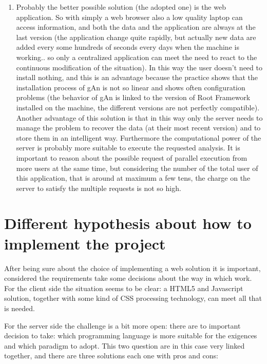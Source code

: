 \begin{enumerate}
\item
Probably the better possible solution (the adopted one) is the web application. So with simply a web browser also a low quality laptop can access information, and both the data and the application are always at the last version (the application change quite rapidly, but actually new data are added every some hundreds of seconds every days when the machine is working.. so only a centralized application can meet the need to react to the continuous modification of the situation).
In this way the user doesn't need to install nothing, and this is an advantage because the practice shows that the installation process of gAn is not so linear and shows often configuration problems (the behavior of gAn is linked to the version of Root Framework installed on the machine, the different versions are not perfectly compatible). Another advantage of this solution is that in this way only the server needs to manage the problem to recover the data (at their most recent version) and to store them in an intelligent way. Furthermore the computational power of the server is probably more suitable to execute the requested analysis. It is important to reason about the possible request of parallel execution from more users at the same time, but considering the number of the total user of this application, that is around at maximum a few tens, the charge on the server to satisfy the multiple requests is not so high.    

\end{enumerate}

\section{Different hypothesis about how to implement the project}

After being sure about the choice of implementing a web solution it is important, considered the requirements take some decisions about the way in which work.
For the client side the situation seems to be clear: a HTML5 and Javascript solution, together with some kind of CSS processing technology, can meet all that is needed.

For the server side the challenge is a bit more open: there are to important decision to take: which programming language is more suitable for the exigences and which paradigm to adopt. This two question are in this case very linked together, and there are three solutions each one with pros and cons:

